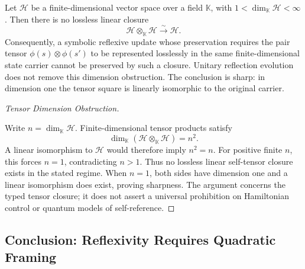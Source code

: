 \begin{lemma}
\label{lemma:bk1_symbolic_quantum_incompatibility}
Let \(\mathcal H\) be a finite-dimensional vector space over a field
\(\mathbb K\), with \(1<\dim_{\mathbb K}\mathcal H<\infty\).  Then there is no
lossless linear closure
\[
 \mathcal H\otimes_{\mathbb K}\mathcal H
   \overset{\sim}{\longrightarrow}\mathcal H.
\]
Consequently, a symbolic reflexive update whose preservation requires the
pair tensor \(\phi(s)\otimes\phi(s')\) to be represented losslessly in the
same finite-dimensional state carrier cannot be preserved by such a closure.
Unitary reflection evolution does not remove this dimension obstruction.
The conclusion is sharp: in dimension one the tensor square is linearly
isomorphic to the original carrier.
\end{lemma}
\begin{proof}[Tensor Dimension Obstruction]
\label{proof:bk1_symbolic_quantum_incompatibility}
\leavevmode

Write \(n=\dim_{\mathbb K}\mathcal H\).  Finite-dimensional tensor products
satisfy
\[
 \dim_{\mathbb K}(\mathcal H\otimes_{\mathbb K}\mathcal H)=n^2.
\]
A linear isomorphism to \(\mathcal H\) would therefore imply \(n^2=n\).
For positive finite \(n\), this forces \(n=1\), contradicting \(n>1\).
Thus no lossless linear self-tensor closure exists in the stated regime.
When \(n=1\), both sides have dimension one and a linear isomorphism does
exist, proving sharpness.  The argument concerns the typed tensor closure; it
does not assert a universal prohibition on Hamiltonian control or quantum
models of self-reference.
\end{proof}

\subsection{Conclusion: Reflexivity Requires Quadratic Framing}
\label{subsec:bk1_reflexivity_requires_quadratic_framing}

